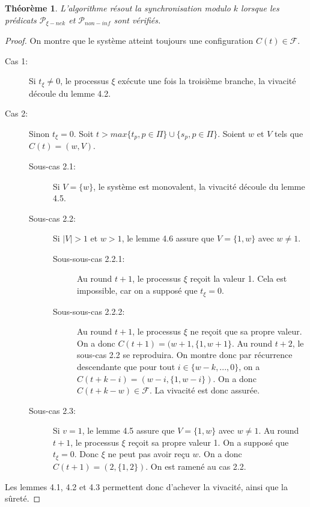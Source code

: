 \documentclass{article}
\newtheorem{theorem}{Théorème}
\begin{document}
\begin{theorem}
	L'algorithme résout la synchronisation modulo $k$ lorsque les prédicats $\mathcal{P}_{\xi-nek}$ et $\mathcal{P}_{non-inf}$ sont vérifiés.
\end{theorem}
\begin{proof}

	On montre que le système atteint toujours une configuration $C(t) \in \mathcal{F}$.

	\begin{description}
		\item[Cas 1:] Si $t_\xi \neq 0$, le processus $\xi$ exécute une fois la troisième branche, la vivacité découle du lemme 4.2.
		\item[Cas 2:] Sinon $t_\xi = 0$. Soit $t > max \{t_p, p \in \Pi\} \cup \{s_p, p \in \Pi\}$. Soient $w$ et $V$ tels que $C(t) = (w, V)$.
			\begin{description}
				\item[Sous-cas 2.1:] Si $V = \{w\}$, le système est monovalent, la vivacité découle du lemme 4.5.
				\item[Sous-cas 2.2:] Si $|V| > 1$ et $w > 1$, le lemme 4.6 assure que $V = \{1, w\}$ avec $w \neq 1$.
					\begin{description}
						\item[Sous-sous-cas 2.2.1:] Au round $t+1$, le processus $\xi$ reçoit la valeur 1. Cela est impossible, car on a supposé que $t_\xi = 0$.
						\item[Sous-sous-cas 2.2.2:] Au round $t+1$, le processus $\xi$ ne reçoit que sa propre valeur. 
							On a donc $C(t+1) = (w+1, \{1, w+1\}$. Au round $t+2$, le sous-cas 2.2 se reproduira.
							On montre donc par récurrence descendante que pour tout $i \in \{w-k, ..., 0\}$,
							on a $C(t+k-i) = (w-i, \{1, w-i\})$. On a donc $C(t+k-w) \in \mathcal{F}$. La vivacité est donc assurée.
					\end{description}
				\item[Sous-cas 2.3:] Si $v = 1$, le lemme 4.5 assure que $V = \{1, w\}$ avec $w \neq 1$.
					Au round $t+1$, le processus $\xi$ reçoit sa propre valeur 1. On a supposé que $t_\xi = 0$. Donc $\xi$ ne peut pas avoir reçu $w$.
					On a donc $C(t+1) = (2, \{1, 2\})$. On est ramené au cas 2.2.
			\end{description}
	\end{description}

	Les lemmes 4.1, 4.2 et 4.3 permettent donc d'achever la vivacité, ainsi que la sûreté.
\end{proof}
\end{document}
